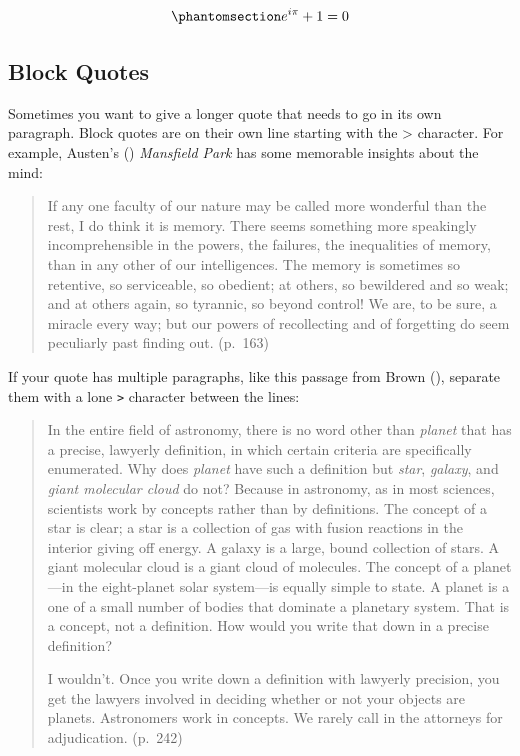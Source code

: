\documentclass[
  jou,
  floatsintext,
  longtable,
  nolmodern,
  notxfonts,
  notimes,
  colorlinks=true,linkcolor=blue,citecolor=blue,urlcolor=blue]{apa7}
\begin{document}
\begin{equation}\phantomsection\label{eq-euler}{
e^{i\pi}+1=0
}\end{equation}

\subsection{Block Quotes}\label{block-quotes}

Sometimes you want to give a longer quote that needs to go in its own
paragraph. Block quotes are on their own line starting with the
\textgreater{} character. For example, Austen's
() \emph{Mansfield
Park} has some memorable insights about the mind:

\begin{quote}
If any one faculty of our nature may be called more wonderful than the
rest, I do think it is memory. There seems something more speakingly
incomprehensible in the powers, the failures, the inequalities of
memory, than in any other of our intelligences. The memory is sometimes
so retentive, so serviceable, so obedient; at others, so bewildered and
so weak; and at others again, so tyrannic, so beyond control! We are, to
be sure, a miracle every way; but our powers of recollecting and of
forgetting do seem peculiarly past finding out. (p.~163)
\end{quote}

If your quote has multiple paragraphs, like this passage from Brown
(), separate them with a
lone \texttt{\textgreater{}} character between the lines:

\begin{quote}
In the entire field of astronomy, there is no word other than
\emph{planet} that has a precise, lawyerly definition, in which certain
criteria are specifically enumerated. Why does \emph{planet} have such a
definition but \emph{star}, \emph{galaxy}, and \emph{giant molecular
cloud} do not? Because in astronomy, as in most sciences, scientists
work by concepts rather than by definitions. The concept of a star is
clear; a star is a collection of gas with fusion reactions in the
interior giving off energy. A galaxy is a large, bound collection of
stars. A giant molecular cloud is a giant cloud of molecules. The
concept of a planet---in the eight-planet solar system---is equally
simple to state. A planet is a one of a small number of bodies that
dominate a planetary system. That is a concept, not a definition. How
would you write that down in a precise definition?

I wouldn't. Once you write down a definition with lawyerly precision,
you get the lawyers involved in deciding whether or not your objects are
planets. Astronomers work in concepts. We rarely call in the attorneys
for adjudication. (p.~242)
\end{quote}
\end{document}
